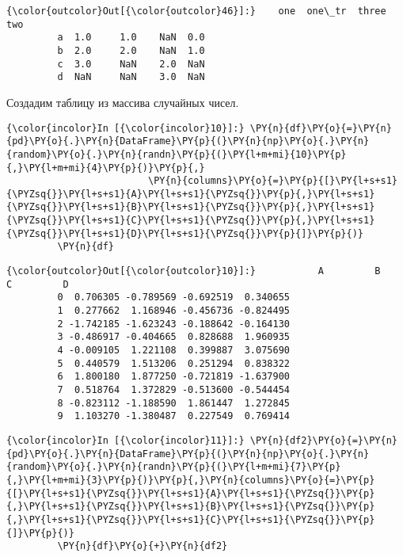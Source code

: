             \begin{Verbatim}[commandchars=\\\{\}]
{\color{outcolor}Out[{\color{outcolor}46}]:}    one  one\_tr  three  two
         a  1.0     1.0    NaN  0.0
         b  2.0     2.0    NaN  1.0
         c  3.0     NaN    2.0  NaN
         d  NaN     NaN    3.0  NaN
\end{Verbatim}
        
    Создадим таблицу из массива случайных чисел.

    \begin{Verbatim}[commandchars=\\\{\}]
{\color{incolor}In [{\color{incolor}10}]:} \PY{n}{df}\PY{o}{=}\PY{n}{pd}\PY{o}{.}\PY{n}{DataFrame}\PY{p}{(}\PY{n}{np}\PY{o}{.}\PY{n}{random}\PY{o}{.}\PY{n}{randn}\PY{p}{(}\PY{l+m+mi}{10}\PY{p}{,}\PY{l+m+mi}{4}\PY{p}{)}\PY{p}{,}
                         \PY{n}{columns}\PY{o}{=}\PY{p}{[}\PY{l+s+s1}{\PYZsq{}}\PY{l+s+s1}{A}\PY{l+s+s1}{\PYZsq{}}\PY{p}{,}\PY{l+s+s1}{\PYZsq{}}\PY{l+s+s1}{B}\PY{l+s+s1}{\PYZsq{}}\PY{p}{,}\PY{l+s+s1}{\PYZsq{}}\PY{l+s+s1}{C}\PY{l+s+s1}{\PYZsq{}}\PY{p}{,}\PY{l+s+s1}{\PYZsq{}}\PY{l+s+s1}{D}\PY{l+s+s1}{\PYZsq{}}\PY{p}{]}\PY{p}{)}
         \PY{n}{df}
\end{Verbatim}

            \begin{Verbatim}[commandchars=\\\{\}]
{\color{outcolor}Out[{\color{outcolor}10}]:}           A         B         C         D
         0  0.706305 -0.789569 -0.692519  0.340655
         1  0.277662  1.168946 -0.456736 -0.824495
         2 -1.742185 -1.623243 -0.188642 -0.164130
         3 -0.486917 -0.404665  0.828688  1.960935
         4 -0.009105  1.221108  0.399887  3.075690
         5  0.440579  1.513206  0.251294  0.838322
         6  1.800180  1.877250 -0.721819 -1.637900
         7  0.518764  1.372829 -0.513600 -0.544454
         8 -0.823112 -1.188590  1.861447  1.272845
         9  1.103270 -1.380487  0.227549  0.769414
\end{Verbatim}
        
    \begin{Verbatim}[commandchars=\\\{\}]
{\color{incolor}In [{\color{incolor}11}]:} \PY{n}{df2}\PY{o}{=}\PY{n}{pd}\PY{o}{.}\PY{n}{DataFrame}\PY{p}{(}\PY{n}{np}\PY{o}{.}\PY{n}{random}\PY{o}{.}\PY{n}{randn}\PY{p}{(}\PY{l+m+mi}{7}\PY{p}{,}\PY{l+m+mi}{3}\PY{p}{)}\PY{p}{,}\PY{n}{columns}\PY{o}{=}\PY{p}{[}\PY{l+s+s1}{\PYZsq{}}\PY{l+s+s1}{A}\PY{l+s+s1}{\PYZsq{}}\PY{p}{,}\PY{l+s+s1}{\PYZsq{}}\PY{l+s+s1}{B}\PY{l+s+s1}{\PYZsq{}}\PY{p}{,}\PY{l+s+s1}{\PYZsq{}}\PY{l+s+s1}{C}\PY{l+s+s1}{\PYZsq{}}\PY{p}{]}\PY{p}{)}
         \PY{n}{df}\PY{o}{+}\PY{n}{df2}
\end{Verbatim}

